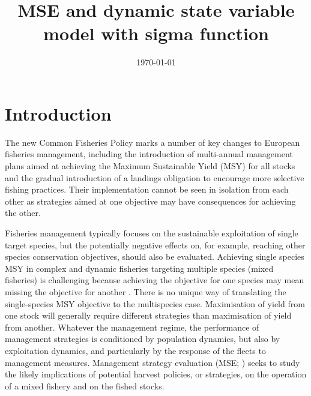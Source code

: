 \documentclass[12pt,oneline,a4paper,numbib]{ouparticle}
\begin{document}
\title{MSE and dynamic state variable model with sigma function}

\author{%
\address{European Commission, Joint Research Centre (JRC), Sustainable Resources Directorate, Water and Marine Resources Unit, Via Enrico Fermi 2749, 21027 Ispra, Italy.}
\and
{}
\address{Wageningen Marine Research, PO Box 68, 1970 AB IJmuiden, The Netherlands.}
}


\date{\today}


\maketitle


\section{Introduction}
\label{sec1}

The new Common Fisheries Policy marks a number of key changes to European fisheries management, including the introduction of multi-annual management plans aimed at achieving the Maximum Sustainable Yield (MSY) for all stocks and the gradual introduction of a landings obligation to encourage more selective fishing practices. Their implementation cannot be seen in isolation from each other as strategies aimed at one objective may have consequences for achieving the other.

Fisheries management typically focuses on the sustainable exploitation of single target species, but the potentially negative effects on, for example, reaching other species conservation objectives, should also be evaluated. Achieving single species MSY in complex and dynamic fisheries targeting multiple species (mixed fisheries) is challenging because achieving the objective for one species may mean missing the objective for another \cite{Ulrich2017}. There is no unique way of translating the single-species MSY objective to the multispecies case. Maximisation of yield from one stock will generally require different strategies than maximisation of yield from another.  Whatever the management regime, the performance of management strategies is conditioned by population dynamics, but also by exploitation dynamics, and particularly by the response of the fleets to management measures. Management strategy evaluation (MSE; \cite{Sainsbury2000, Smith1994, Venables2009}) seeks to study the likely implications of potential harvest policies, or strategies, on the operation of a mixed fishery and on the fished stocks. 
\end{document}
